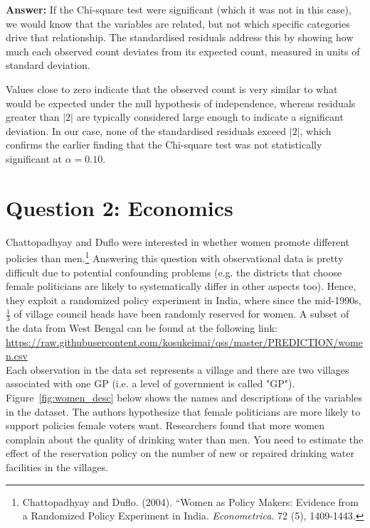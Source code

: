 \documentclass[12pt,letterpaper]{article}
\begin{document}
\begin{enumerate}
	\textbf{Answer:} 
	If the Chi-square test were significant (which it was not in this case), we would know that the variables are related, but not which specific categories drive that relationship. The standardised residuals address this by showing how much each observed count deviates from its expected count, measured in units of standard deviation. 
	
	Values close to zero indicate that the observed count is very similar to what would be expected under the null hypothesis of independence, whereas residuals greater than $\lvert 2 \rvert$ are typically considered large enough to indicate a significant deviation. In our case, none of the standardised residuals exceed $\lvert 2 \rvert$, which confirms the earlier finding that the Chi-square test was not statistically significant at $\alpha = 0.10$.
	
\end{enumerate}
\newpage

\section*{Question 2: Economics}
Chattopadhyay and Duflo were interested in whether women promote different policies than men.\footnote{Chattopadhyay and Duflo. (2004). ``Women as Policy Makers: Evidence from a Randomized Policy Experiment in India. \textit{Econometrica}. 72 (5), 1409-1443.} Answering this question with observational data is pretty difficult due to potential confounding problems (e.g. the districts that choose female politicians are likely to systematically differ in other aspects too). Hence, they exploit a randomized policy experiment in India, where since the mid-1990s, $\frac{1}{3}$ of village council heads have been randomly reserved for women. A subset of the data from West Bengal can be found at the following link: \url{https://raw.githubusercontent.com/kosukeimai/qss/master/PREDICTION/women.csv}\\

\noindent Each observation in the data set represents a village and there are two villages associated with one GP (i.e. a level of government is called "GP"). Figure~\ref{fig:women_desc} below shows the names and descriptions of the variables in the dataset. The authors hypothesize that female politicians are more likely to support policies female voters want. Researchers found that more women complain about the quality of drinking water than men. You need to estimate the effect of the reservation policy on the number of new or repaired drinking water facilities in the villages.
\vspace{.5cm}
\end{document}
